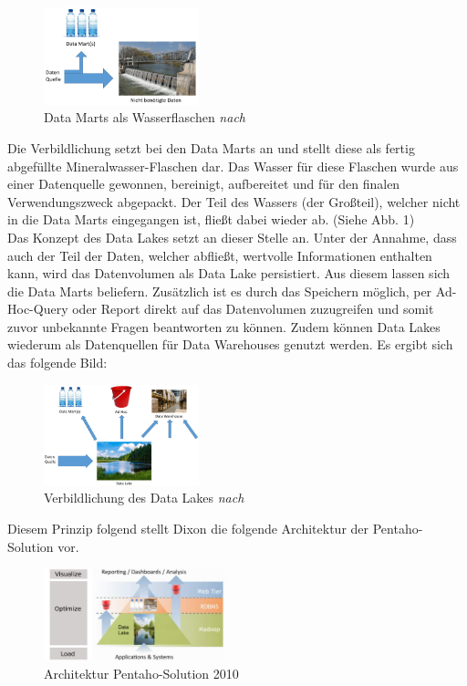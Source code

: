 \documentclass[twoside,twocolumn]{article}
\begin{document}
\begin{figure}[h]
	\centering 
	\includegraphics[width=0.4\textwidth]{img/p1} 
	\caption{Data Marts als Wasserflaschen \textit{nach} \cite{src6}}	
\end{figure}

Die Verbildlichung setzt bei den Data Marts an und stellt diese als fertig abgefüllte Mineralwasser-Flaschen dar. Das Wasser für diese Flaschen wurde aus einer Datenquelle gewonnen, bereinigt, aufbereitet und für den finalen Verwendungszweck abgepackt. Der Teil des Wassers (der Großteil), welcher nicht in die Data Marts eingegangen ist, fließt dabei wieder ab. (Siehe Abb. 1)\\
Das Konzept des Data Lakes setzt an dieser Stelle an. Unter der Annahme, dass auch der Teil der Daten, welcher abfließt, wertvolle Informationen enthalten kann, wird das Datenvolumen als Data Lake persistiert. Aus diesem lassen sich die Data Marts beliefern. Zusätzlich ist es durch das Speichern möglich, per Ad-Hoc-Query oder Report direkt auf das Datenvolumen zuzugreifen und somit zuvor unbekannte Fragen beantworten zu können. Zudem können Data Lakes wiederum als Datenquellen für Data Warehouses genutzt werden. Es ergibt sich das folgende Bild:
\begin{figure}[h]
	\centering 
	\includegraphics[width=0.4\textwidth]{img/p2} 
	\caption{Verbildlichung des Data Lakes \textit{nach} \cite{src6}}	
\end{figure}

\noindent Diesem Prinzip folgend stellt Dixon die folgende Architektur der Pentaho-Solution vor.
\begin{figure}[h]
	\centering 
	\includegraphics[width=0.47\textwidth]{img/p3} 
	\caption{Architektur Pentaho-Solution 2010 \cite{src6b}}	
\end{figure}
\end{document}
